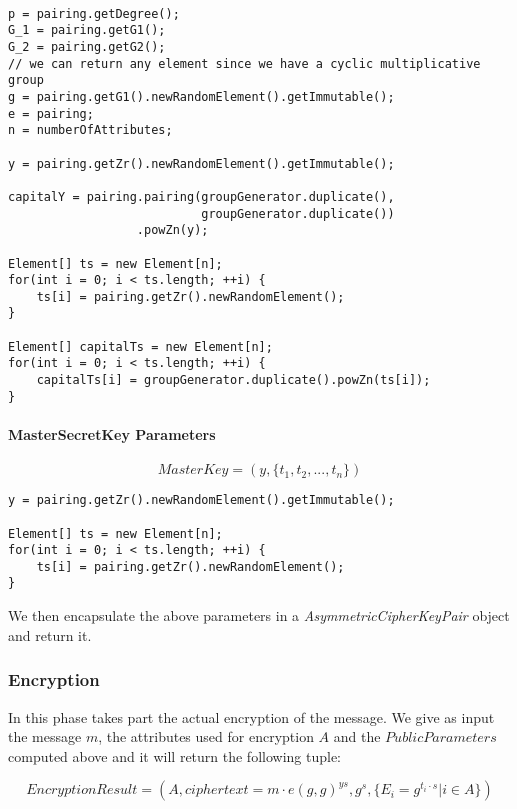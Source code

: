 \documentclass[12pt]{article}
\begin{document}
\begin{lstlisting}

p = pairing.getDegree();
G_1 = pairing.getG1();
G_2 = pairing.getG2();
// we can return any element since we have a cyclic multiplicative group
g = pairing.getG1().newRandomElement().getImmutable();
e = pairing;
n = numberOfAttributes;

y = pairing.getZr().newRandomElement().getImmutable();

capitalY = pairing.pairing(groupGenerator.duplicate(), 
                           groupGenerator.duplicate())
                  .powZn(y);

Element[] ts = new Element[n];
for(int i = 0; i < ts.length; ++i) {
    ts[i] = pairing.getZr().newRandomElement();
}

Element[] capitalTs = new Element[n];
for(int i = 0; i < ts.length; ++i) {
    capitalTs[i] = groupGenerator.duplicate().powZn(ts[i]);
}
\end{lstlisting}

\paragraph{MasterSecretKey Parameters}

$$MasterKey = (y, \{t_1, t_2, ..., t_n\})$$

\begin{lstlisting}
y = pairing.getZr().newRandomElement().getImmutable();

Element[] ts = new Element[n];
for(int i = 0; i < ts.length; ++i) {
    ts[i] = pairing.getZr().newRandomElement();
}
\end{lstlisting}

We then encapsulate the above parameters in a \textit{AsymmetricCipherKeyPair} object and return it.


\subsubsection{Encryption}

In this phase takes part the actual encryption of the message. We give as input the message $m$, the attributes used for encryption $A$ and the $PublicParameters$ computed above and it will return the following tuple:

$$EncryptionResult = (A, ciphertext = m \cdot e(g, g)^{ys}, g^s, \{E_i = g^{t_i \cdot s} | i \in A\})$$
\end{document}
